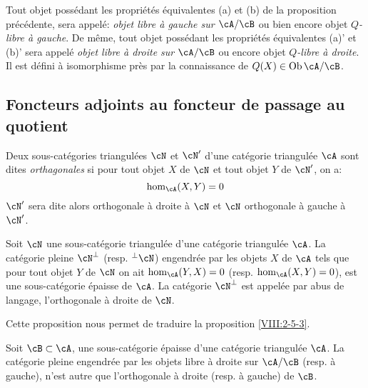 \begin{definition}\label{VIII:2-5-4}
Tout objet poss\'edant les propri\'et\'es \'equivalentes (a) et (b) de la 
proposition pr\'ec\'edente, sera appel\'e: \emph{objet libre \`a gauche sur 
$\cA/\cB$} ou bien encore objet \emph{$Q$-libre \`a gauche}. De m\^eme, tout 
objet poss\'edant les propri\'et\'es \'equivalentes (a)' et (b)' sera appel\'e 
\emph{objet libre \`a droite sur $\cA/\cB$} ou encore objet 
\emph{$Q$-libre \`a droite}. Il est d\'efini \`a isomorphisme pr\`es par la 
connaissance de $Q(X)\in\operatorname{Ob}{\cA/\cB}$. 
\end{definition}





\subsection{Foncteurs adjoints au foncteur de passage au quotient}\label{VIII:2-6}





\begin{definition}\label{VIII:2-6-1}
Deux sous-cat\'egories triangul\'ees $\cN$ et $\cN'$ d'une cat\'egorie 
triangul\'ee $\cA$ sont dites \emph{orthagonales} si pour tout objet $X$ de 
$\cN$ et tout objet $Y$ de $\cN'$, on a: 
\[
  \hom_\cA(X,Y) = 0 
\]
$\cN'$ sera dite alors orthogonale \`a droite \`a $\cN$ et $\cN$ orthogonale 
\`a gauche \`a $\cN'$. 
\end{definition}





\begin{proposition}\label{VIII:2-6-2}
Soit $\cN$ une sous-cat\'egorie triangul\'ee d'une cat\'egorie triangul\'ee 
$\cA$. La cat\'egorie pleine $\cN^\bot$ (resp. $^\bot\cN$) engendr\'ee par les 
objets $X$ de $\cA$ tels que pour tout objet $Y$ de $\cN$ on ait 
$\hom_\cA(Y,X)=0$ (resp. $\hom_\cA(X,Y)=0$), est une sous-cat\'egorie \'epaisse 
de $\cA$. La cat\'egorie $\cN^\bot$ est appel\'ee par abus de langage, 
l'orthogonale \`a droite de $\cN$. 
\end{proposition}

Cette proposition nous permet de traduire la proposition \ref{VIII:2-5-3}. 





\begin{proposition}\label{VIII:2-6-3}
Soit $\cB\subset\cA$, une sous-cat\'egorie \'epaisse d'une cat\'egorie 
triangul\'ee $\cA$. La cat\'egorie pleine engendr\'ee par les objets libre \`a 
droite sur $\cA/\cB$ (resp. \`a gauche), n'est autre que l'orthogonale \`a 
droite (resp. \`a gauche) de $\cB$. 
\end{proposition}





